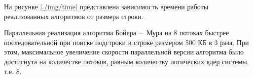 На рисунке \ref{./img/time} представлена зависимость времени работы реализованных алгоритмов от размера строки.

Параллельная реализация алгоритма Бойера~--~Мура на 8 потоках быстрее последовательной при поиске подстроки в строке размером 500 КБ в 3 раза. При этом, максимальное увеличение скорости параллельной версии алгоритма было достигнута на количестве потоков, равным количеству логических ядер системы, т.е. 8.
